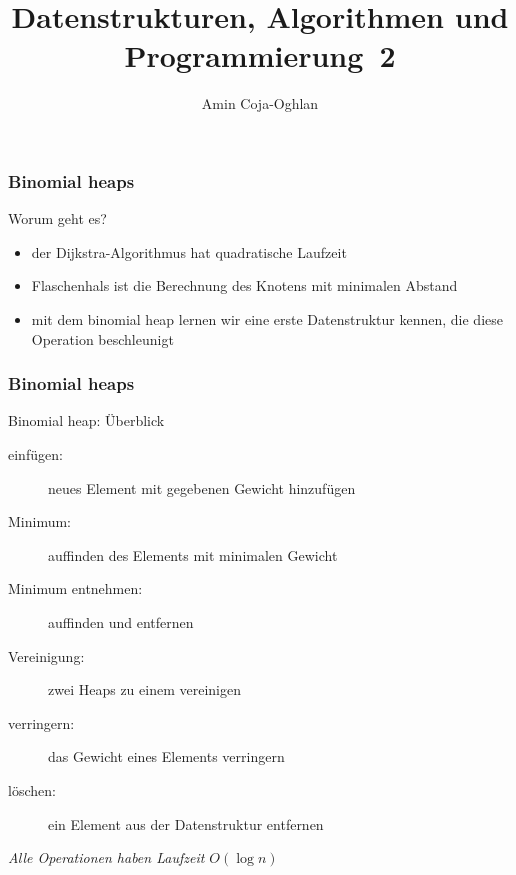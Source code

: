\documentclass[aspectratio=1610, 11pt]{beamer}
\title{Datenstrukturen, Algorithmen und Programmierung~2}
\author[A.~Coja-Oghlan]{Amin Coja-Oghlan}
\institute[DAP2]{Lehrstuhl Informatik 2\\Fakult\"at f\"ur Informatik}
\newcommand{\mytitle}{Binomial heaps}
\begin{document}
\frame[plain]{\titlepage}

\begin{frame}\frametitle{\mytitle}
	\begin{exampleblock}{Worum geht es?}
		\begin{itemize}
			\item der Dijkstra-Algorithmus hat quadratische Laufzeit
			\item Flaschenhals ist die Berechnung des Knotens mit minimalen Abstand
			\item mit dem binomial heap lernen wir eine erste Datenstruktur kennen, die diese Operation beschleunigt
		\end{itemize}
	\end{exampleblock}
\end{frame}

\begin{frame}\frametitle{\mytitle}
	\begin{exampleblock}{Binomial heap: \"Uberblick}
		\begin{description}
			\item[einf\"ugen:] neues Element mit gegebenen Gewicht hinzuf\"ugen
			\item[Minimum:] auffinden des Elements mit minimalen Gewicht
			\item[Minimum entnehmen:] auffinden und entfernen
			\item[Vereinigung:] zwei Heaps zu einem vereinigen
			\item[verringern:] das Gewicht eines Elements verringern
			\item[l\"oschen:] ein Element aus der Datenstruktur entfernen
		\end{description}
		\itshape Alle Operationen haben Laufzeit $O(\log n)$
	\end{exampleblock}
\end{frame}
\end{document}

